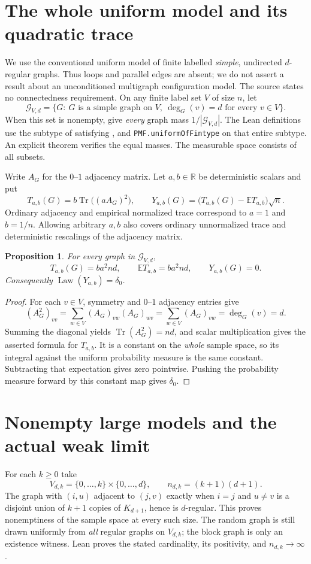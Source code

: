 \documentclass[11pt]{article}
\newcommand{\Tr}{\operatorname{Tr}}
\newcommand{\Law}{\operatorname{Law}}
\newcommand{\E}{\mathbb E}
\newcommand{\lean}[1]{\nolinkurl{#1}}
\newcommand{\code}[1]{\texttt{\detokenize{#1}}}
\newtheorem{proposition}{Proposition}
\begin{document}
\section{The whole uniform model and its quadratic trace}
We use the conventional uniform model of finite labelled \emph{simple},
undirected $d$-regular graphs. Thus loops and parallel edges are absent; we do
not assert a result about an unconditioned multigraph configuration model.
The source states no connectedness requirement. On any finite label set $V$
of size $n$, let
\[
 \mathcal G_{V,d}=\{G:\ G\text{ is a simple graph on }V,
                   \ \deg_G(v)=d\text{ for every }v\in V\}.
\]
When this set is nonempty, give \emph{every} graph mass
$1/|\mathcal G_{V,d}|$. The Lean definitions use the subtype of
\code{SimpleGraph V} satisfying \code{IsRegularOfDegree d}, and
\lean{PMF.uniformOfFintype} on that entire subtype. An explicit theorem verifies
the equal masses. The measurable space consists of all subsets.

Write $A_G$ for the $0$--$1$ adjacency matrix. Let $a,b\in\mathbb R$ be
deterministic scalars and put
\[
 T_{a,b}(G)=b\Tr\bigl((aA_G)^2\bigr),\qquad
 Y_{a,b}(G)=\bigl(T_{a,b}(G)-\E T_{a,b}\bigr)\sqrt n.
\]
Ordinary adjacency and empirical normalized trace correspond to $a=1$ and
$b=1/n$. Allowing arbitrary $a,b$ also covers ordinary unnormalized trace and
deterministic rescalings of the adjacency matrix.

\begin{proposition}\label{prop:zero}
For every graph in $\mathcal G_{V,d}$,
\[
 T_{a,b}(G)=ba^2nd,\qquad \E T_{a,b}=ba^2nd,\qquad Y_{a,b}(G)=0.
\]
Consequently $\Law(Y_{a,b})=\delta_0$.
\end{proposition}
\begin{proof}
For each $v\in V$, symmetry and $0$--$1$ adjacency entries give
\[
 (A_G^2)_{vv}=\sum_{w\in V}(A_G)_{vw}(A_G)_{wv}
             =\sum_{w\in V}(A_G)_{vw}=\deg_G(v)=d.
\]
Summing the diagonal yields $\Tr(A_G^2)=nd$, and scalar multiplication gives
the asserted formula for $T_{a,b}$. It is a constant on the \emph{whole}
sample space, so its integral against the uniform probability measure is the
same constant. Subtracting that expectation gives zero pointwise. Pushing the
probability measure forward by this constant map gives $\delta_0$.
\end{proof}

\section{Nonempty large models and the actual weak limit}
For each $k\geq0$ take
\[
 V_{d,k}=\{0,\ldots,k\}\times\{0,\ldots,d\},\qquad
 n_{d,k}=(k+1)(d+1).
\]
The graph with $(i,u)$ adjacent to $(j,v)$ exactly when $i=j$ and $u\ne v$
is a disjoint union of $k+1$ copies of $K_{d+1}$, hence is $d$-regular.
This proves nonemptiness of the sample space at every such size. The random
graph is still drawn uniformly from \emph{all} regular graphs on $V_{d,k}$;
the block graph is only an existence witness. Lean proves the stated
cardinality, its positivity, and $n_{d,k}\to\infty$.
\end{document}
